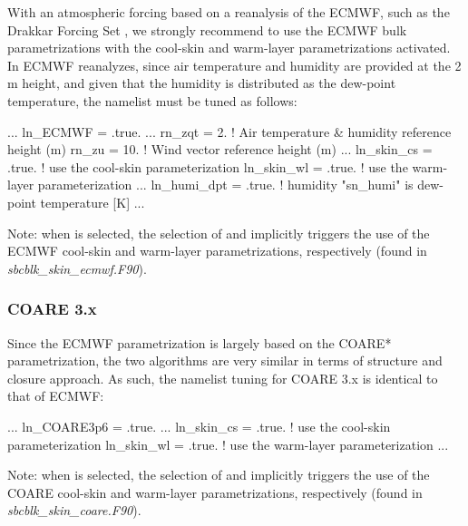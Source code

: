 \documentclass[../main/NEMO_manual]{subfiles}
\begin{document}
With an atmospheric forcing based on a reanalysis of the ECMWF, such as the
Drakkar Forcing Set \citep{brodeau.barnier.ea_OM10}, we strongly recommend to
use the ECMWF bulk parametrizations with the cool-skin and warm-layer
parametrizations activated. In ECMWF reanalyzes, since air temperature and
humidity are provided at the 2\,m height, and given that the humidity is
distributed as the dew-point temperature, the namelist must be tuned as follows:

\begin{forlines}
  ...
  ln_ECMWF   = .true.
  ...     
  rn_zqt     =  2.     ! Air temperature & humidity reference height (m)
  rn_zu      = 10.     ! Wind vector reference height (m)
  ...
  ln_skin_cs = .true. ! use the cool-skin parameterization
  ln_skin_wl = .true. ! use the warm-layer parameterization
  ...
  ln_humi_dpt = .true. !  humidity "sn_humi" is dew-point temperature [K]
  ...
\end{forlines}

Note: when  is selected, the selection
of  and  implicitly
triggers the use of the ECMWF cool-skin and warm-layer parametrizations,
respectively (found in \textit{sbcblk\_skin\_ecmwf.F90}).



\subsubsection{COARE 3.x}

Since the ECMWF parametrization is largely based on the COARE* parametrization,
the two algorithms are very similar in terms of structure and closure
approach. As such, the namelist tuning for COARE 3.x is identical to that of
ECMWF:

\begin{forlines}
  ...
  ln_COARE3p6 = .true.
  ...     
  ln_skin_cs = .true. ! use the cool-skin parameterization
  ln_skin_wl = .true. ! use the warm-layer parameterization
  ...
\end{forlines}

Note: when  is selected, the selection
of  and  implicitly
triggers the use of the COARE cool-skin and warm-layer parametrizations,
respectively (found in \textit{sbcblk\_skin\_coare.F90}).


\end{document}
